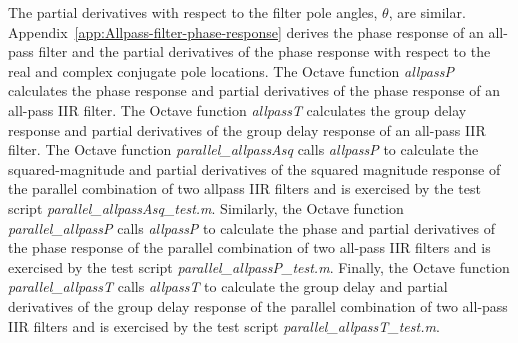 \documentclass[a4paper,twoside,10pt,english]{report}
\begin{document}
The partial derivatives with respect to the filter pole angles, $\theta$, are
similar. Appendix~\ref{app:Allpass-filter-phase-response} derives the phase
response of an all-pass filter and the partial derivatives of the phase
response with respect to the real and complex conjugate pole locations. The
Octave function \emph{allpassP} calculates the phase response and partial
derivatives of the phase response of an all-pass IIR filter. The
Octave function \emph{allpassT} calculates the group delay response and partial
derivatives of the group delay response of an all-pass IIR filter.
The Octave function \emph{parallel\_allpassAsq} calls \emph{allpassP} to 
calculate the squared-magnitude and partial derivatives of the squared
magnitude response of the parallel combination of two allpass IIR filters 
and is exercised by the test script \emph{parallel\_allpassAsq\_test.m}.
Similarly, the Octave function \emph{parallel\_allpassP} calls \emph{allpassP}
to calculate the phase and partial derivatives of the phase response of the
parallel combination of two all-pass IIR filters and is exercised by the test
script \emph{parallel\_allpassP\_test.m}. Finally, the Octave function 
\emph{parallel\_allpassT} calls \emph{allpassT} to calculate the group delay
and partial derivatives of the group delay response of the parallel combination
of two all-pass IIR filters and is exercised by the test script 
\emph{parallel\_allpassT\_test.m}.
\end{document}
